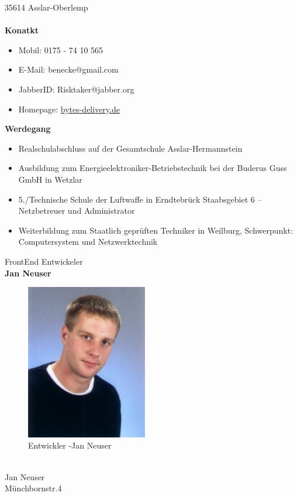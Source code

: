 35614 Asslar-Oberlemp \\
\\
\textbf{Konatkt} \\
\begin{itemize}
\item Mobil: 0175 - 74 10 565
\item E-Mail: benecke@gmail.com
\item JabberID: Risktaker@jabber.org 
\item Homepage: \href{http://www.bytes-delivery.de}{bytes-delivery.de}
\end{itemize}
\textbf{Werdegang} \\
\begin{itemize}
\item Realschulabschluss auf der Gesamtschule Asslar-Hermannstein
\item Ausbildung zum Energieelektroniker-Betriebstechnik bei der Buderus Guss GmbH in Wetzlar
\item 5./Technische Schule der Luftwaffe in Erndtebrück Staabsgebiet 6 – Netzbetreuer und Administrator
\item Weiterbildung zum Staatlich geprüften Techniker in Weilburg, Schwerpunkt: Computersystem und Netzwerktechnik	
\end{itemize}
\pagebreak
FrontEnd Entwickeler \\
\textbf{Jan Neuser}
\\
\begin{figure}[h]
\begin{center}
   \includegraphics[width=150pt]{../bilder/jan.jpg}
   \caption{Entwickler -Jan Neuser}
   \label{Entwickler - Frontend und Datenbank}
\end{center}
\end{figure}
\\
Jan Neuser \\
Münchbornstr.4 \\

